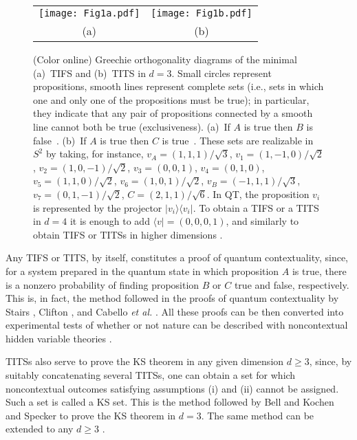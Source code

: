 \documentclass[%
 twocolumn,
 groupedaddress,
 showpacs,
 showkeys,
 preprintnumbers,
 amsmath,amssymb,
 aps,
 pra,
 longbibliography,
 floatfix,
 ]{revtex4-1}
\begin{document}

\begin{figure}
	\begin{center}
		\setlength{\tabcolsep}{0em}
		\begin{tabular}{cc}
			\texttt{[image: Fig1a.pdf]} & \texttt{[image: Fig1b.pdf]} \\
			(a) & (b)
		\end{tabular}
	\end{center}
	\caption{\label{Fig1}
		(Color online)
		Greechie orthogonality diagrams of the minimal
		(a)~TIFS and (b)~TITS in $d=3$.
		Small circles represent propositions, smooth lines represent complete sets
		(i.e., sets in which one and only one of the propositions must be true); in particular, they indicate
		that any pair of propositions connected by a smooth line cannot both be true (exclusiveness).
		(a)~If $A$ is true then $B$ is false~\cite{KS65}.
		(b)~If $A$ is true then $C$ is true~\cite{KS67}.
		These sets are realizable in $S^2$ by taking,
		for instance,
		$v_A = ({1,1,1} )/\sqrt{3}$,
		$v_1 = ({1,-1,0} )/\sqrt{2}$,
		$v_2 = ({1,0,-1} )/\sqrt{2}$,
		$v_3 = ({0,0,1} ) $,
		$v_4 = ({0,1,0} )$,
		$v_5 = ({1,1,0} )/\sqrt{2}$,
		$v_6 = ({1,0,1} )/\sqrt{2}$,
		$v_B = ({-1,1,1}) / \sqrt{3} $,
		$v_7 = ({0,1,-1} )/\sqrt{2}$,
		$C = ({2,1,1} )/\sqrt{6} $.
		In QT, the proposition $v_i$ is represented by the projector $| v_i \rangle\langle v_i |$.
		To obtain a TIFS or a TITS in $d=4$ it
		is enough to add $\langle v| = (0,0,0,1)$, and similarly to obtain TIFS or TITSs in higher dimensions \cite{CG96}.}
\end{figure}


Any TIFS or TITS, by itself, constitutes a proof of quantum contextuality, since, for a system prepared in the quantum state in which proposition $A$ is true, there is a nonzero probability of finding proposition $B$ or $C$ true and false, respectively. This is, in fact, the method followed in the proofs of quantum contextuality by Stairs \cite{Stairs83}, Clifton \cite{Clifton93}, and Cabello {\em et al.} \cite{CG95,CBTB13}. All these proofs can be then converted into experimental tests of whether or not nature can be described with noncontextual hidden variable theories \cite{CT11}.

TITSs also serve to prove the KS theorem in any given dimension $d \ge 3$, since, by suitably concatenating several TITSs, one can obtain a set for which noncontextual outcomes satisfying assumptions (i) and (ii) cannot be assigned. Such a set is called a KS set. This is the method followed by Bell \cite{Bell64} and Kochen and Specker \cite{KS67} to prove the KS theorem in $d=3$. The same method can be extended to any $d \ge 3$ \cite{CG96}.
\end{document}
